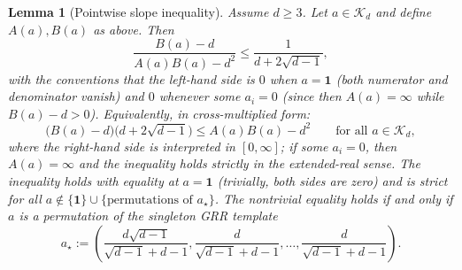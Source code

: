 \documentclass[11pt]{amsart}
\newtheorem{lemma}[lemma]{Lemma}
\theoremstyle{definition}
\newcommand{\one}{\mathbf 1}
\newcommand{\cK}{\mathcal K}
\begin{document}
\begin{lemma}[Pointwise slope inequality]\label{lem:slope}
Assume $d\ge 3$. Let $a\in\cK_d$ and define $A(a),B(a)$ as above. Then
\[
\frac{B(a)-d}{A(a)B(a)-d^2}\le \frac{1}{d+2\sqrt{d-1}},
\]
with the conventions that the left-hand side is $0$ when $a=\one$ (both numerator and denominator vanish) and $0$ whenever some $a_i=0$ (since then $A(a)=\infty$ while $B(a)-d>0$). Equivalently, in cross-multiplied form:
\[
\bigl(B(a)-d\bigr)\bigl(d+2\sqrt{d-1}\bigr)\le A(a)B(a)-d^2
\qquad\text{for all }a\in\cK_d,
\]
where the right-hand side is interpreted in $[0,\infty]$; if some $a_i=0$, then $A(a)=\infty$ and the inequality holds strictly in the extended-real sense. The inequality holds with equality at $a=\one$ (trivially, both sides are zero) and is strict for all $a\notin\{\one\}\cup\{\text{permutations of }a_\star\}$. The nontrivial equality holds if and only if $a$ is a permutation of the singleton GRR template
\[
a_\star:=\left(\frac{d\sqrt{d-1}}{\sqrt{d-1}+d-1},\frac{d}{\sqrt{d-1}+d-1},\dots,\frac{d}{\sqrt{d-1}+d-1}\right).
\]
\end{lemma}
\end{document}
